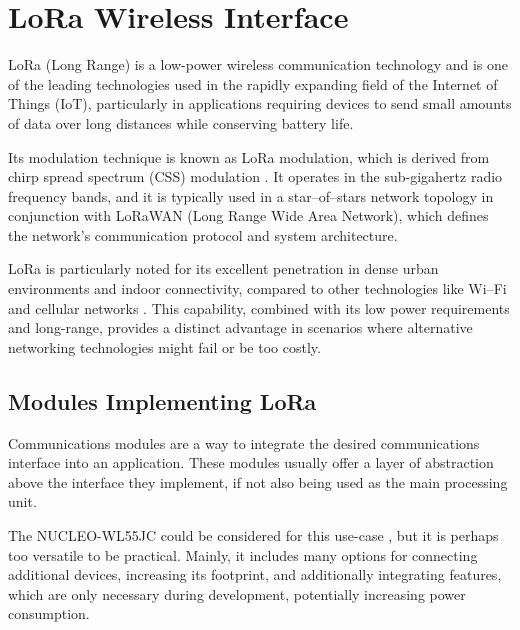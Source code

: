 \section{LoRa Wireless Interface}
LoRa (Long Range) is a low-power wireless communication technology and is one of the leading technologies used in the rapidly expanding field of the Internet of Things (IoT), particularly in applications requiring devices to send small amounts of data over long distances while conserving battery life.

Its modulation technique is known as LoRa modulation, which is derived from chirp spread spectrum (CSS) modulation \cite{semtech_corporation_sx12612_2024}. It operates in the sub-gigahertz radio frequency bands, and it is typically used in a star--of--stars network topology in conjunction with LoRaWAN (Long Range Wide Area Network), which defines the network's communication protocol and system architecture.

LoRa is particularly noted for its excellent penetration in dense urban environments and indoor connectivity, compared to other technologies like Wi--Fi and cellular networks \cite{stmicroelectronics_lora_2024,semtech_corporation_sx12612_2024,seeedstudio_wio-e5-wireless_2024}. This capability, combined with its low power requirements and long-range, provides a distinct advantage in scenarios where alternative networking technologies might fail or be too costly.

\subsection{Modules Implementing LoRa}
Communications modules are a way to integrate the desired communications interface into an application. These modules usually offer a layer of abstraction above the interface they implement, if not also being used as the main processing unit.

The NUCLEO-WL55JC could be considered for this use-case \cite{stmicroelectronics_nucleo-wl55jc_2024}, but it is perhaps too versatile to be practical. Mainly, it includes many options for connecting additional devices, increasing its footprint, and additionally integrating features, which are only necessary during development, potentially increasing power consumption.

